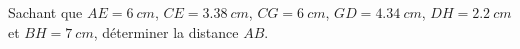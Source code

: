 \documentclass{../../vmdm}
\begin{document}
\begin{questions}
    Sachant que $AE = \qty{6}{cm}$, $CE = \qty{3.38}{cm}$, $CG = \qty{6}{cm}$, $GD=\qty{4.34}{cm}$, $DH = \qty{2.2}{cm}$ et $BH = \qty{7}{cm}$, déterminer la distance $AB$. 
 
    \question 
\end{questions}


\vfill

\begin{center}
\gradetable[h][questions]
\end{center}
\end{document}
